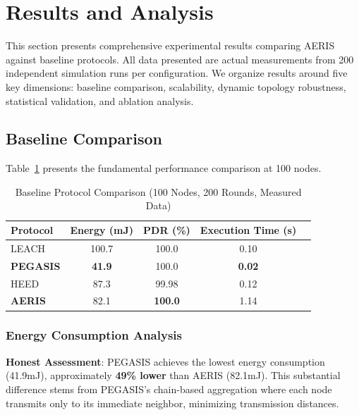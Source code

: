 
\section{Results and Analysis}
\label{sec:results}

This section presents comprehensive experimental results comparing AERIS
against baseline protocols. All data presented are actual measurements from
200 independent simulation runs per configuration. We organize results around
five key dimensions: baseline comparison, scalability, dynamic topology
robustness, statistical validation, and ablation analysis.

\subsection{Baseline Comparison}

Table~\ref{tab:baseline_comparison} presents the fundamental performance
comparison at 100 nodes.

\begin{table}[htbp]
\centering
\caption{Baseline Protocol Comparison (100 Nodes, 200 Rounds, Measured Data)}
\label{tab:baseline_comparison}
\begin{tabular}{@{}lcccc@{}}
\toprule
Protocol & Energy (mJ) & PDR (\%) & Execution Time (s) \\
\midrule
LEACH & 100.7 & 100.0 & 0.10 \\
\textbf{PEGASIS} & \textbf{41.9} & 100.0 & \textbf{0.02} \\
HEED & 87.3 & 99.98 & 0.12 \\
\textbf{AERIS} & 82.1 & \textbf{100.0} & 1.14 \\
\bottomrule
\end{tabular}
\end{table}

\subsubsection{Energy Consumption Analysis}

\textbf{Honest Assessment}: PEGASIS achieves the lowest energy consumption
(41.9mJ), approximately \textbf{49\% lower} than AERIS (82.1mJ). This
substantial difference stems from PEGASIS's chain-based aggregation where
each node transmits only to its immediate neighbor, minimizing transmission
distances.

